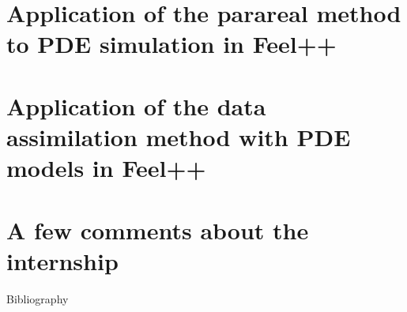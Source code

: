 \documentclass[10pt,xcolor={table,dvipsnames},t]{beamer}
\begin{document}
	\section{Application of the parareal method to PDE simulation in Feel++}

	
	
	\section{Application of the data assimilation method with PDE models in Feel++}
	
	
	
	\section{A few comments about the internship}
	
	\begin{frame}[allowframebreaks]{Bibliography}
		\printbibliography[heading=none]
	\end{frame}
	
\end{document}
